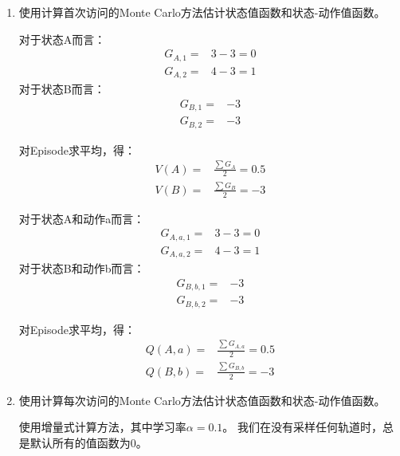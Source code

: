 \documentclass[12pt, a4paper]{article}
\begin{document}
    \begin{enumerate}

    \item 使用计算首次访问的Monte Carlo方法估计状态值函数和状态-动作值函数。

        对于状态A而言：
        \begin{align*}
        G_{A,1} =& 3 - 3 = 0 \tag{Episode 1} \\
        G_{A,2} =& 4 - 3 = 1 \tag{Episode 2}
        \end{align*}
        对于状态B而言：
        \begin{align*}
        G_{B,1} =& -3 \tag{Episode 1} \\
        G_{B,2} =& -3 \tag{Episode 2}
        \end{align*}

        对Episode求平均，得：
        \begin{align*}
        V(A) =& \frac{\sum G_A}{2} = 0.5 \\
        V(B) =& \frac{\sum G_B}{2} = -3
        \end{align*}

        对于状态A和动作a而言：
        \begin{align*}
        G_{A, a, 1} =& 3 - 3 = 0 \tag{Episode 1} \\
        G_{A, a, 2} =& 4 - 3 = 1 \tag{Episode 2}
        \end{align*}
        对于状态B和动作b而言：
        \begin{align*}
        G_{B, b, 1} =& -3 \tag{Episode 1} \\
        G_{B, b, 2} =& -3 \tag{Episode 2}
        \end{align*}

        对Episode求平均，得：
        \begin{align*}
        Q(A, a) =& \frac{\sum G_{A, a}}{2} = 0.5 \\
        Q(B, b) =& \frac{\sum G_{B, b}}{2} = -3
        \end{align*}

    \item 使用计算每次访问的Monte Carlo方法估计状态值函数和状态-动作值函数。

        使用增量式计算方法，其中学习率$\alpha = 0.1$。
        我们在没有采样任何轨道时，总是默认所有的值函数为$0$。


\end{enumerate}
\end{document}
